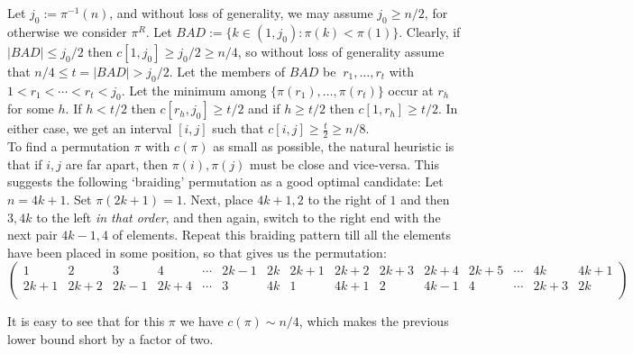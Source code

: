 \documentclass[11pt, a4paper]{article}
\theoremstyle{compact}
\begin{document}
Let $j_0:=\pi^{-1}(n)$, and without loss of generality, we may assume $j_0\ge n/2$, for otherwise we consider $\pi^R$. %
Let $BAD:=\{k\in(1,j_0): \pi(k)<\pi(1)\}$. Clearly, if $|BAD|\le j_0/2$ then $c[1,j_0]\ge j_0/2\ge n/4$, so without loss of generality assume that $n/4\le t=|BAD|>j_0/2$. Let the members of $BAD$ be $\ r_1,\ldots, r_t$ with $1<r_1<\cdots<r_t<j_0$. Let the minimum among $\{\pi(r_1),\ldots,\pi(r_t)\}$ occur at $r_h$ for some $h$. If $h<t/2$ then $c[r_h,j_0]\ge t/2$ and if $h\ge t/2$ then $c[1,r_h]\ge t/2$. In either case, we get an interval $[i,j]$ such that $c[i,j]\ge \frac{t}{2}\ge n/8$.\\

To find a permutation $\pi$ with $c(\pi)$ as small as possible, the natural heuristic is that if $i,j$ are far apart, then $\pi(i), \pi(j)$ must be close and vice-versa. This suggests the following `braiding' permutation as a good optimal candidate: 
Let $n = 4k + 1$. Set $\pi(2k+1)=1$. Next, place $4k + 1, 2$ to the right of $1$ and then $3, 4k$ to the left \emph{in that order}, and then again, switch to the right end with the next pair $4k-1, 4$ of elements. Repeat this braiding pattern till all the elements have been placed in some position, so that gives us the permutation:
 \[
 \begin{pmatrix}
    1 & 2 & 3 & 4 & \cdots & 2k -1 & 2k  & 2k + 1 & 2k + 2 & 2k + 3 & 2k + 4 & 2k + 5 & \cdots & 4k & 4k + 1 \\
   2k + 1 & 2k + 2 & 2k -1 & 2k + 4 & \cdots &  3 & 4k & 1 & 4k + 1 & 2 & 4k -1 & 4 & \cdots & 2k + 3 & 2k\\
  \end{pmatrix}
    \]

It is easy to see that for this $\pi$ we have $c(\pi)\sim n/4$, which makes the previous lower bound short by a factor of two.\\
\end{document}
